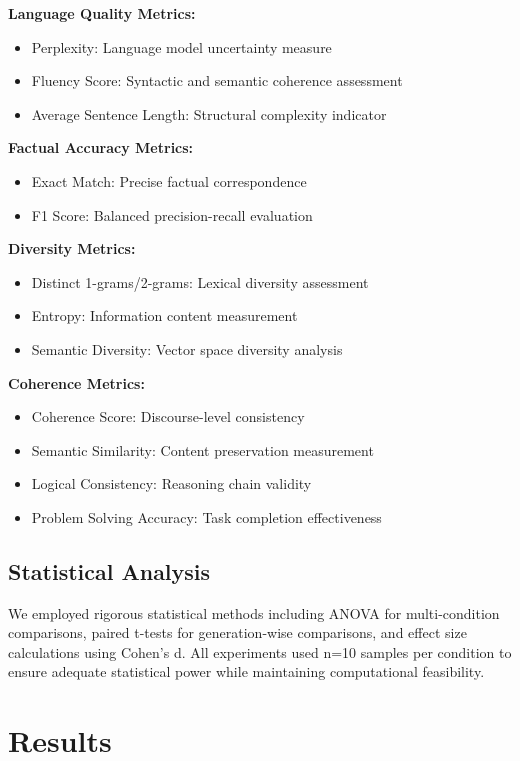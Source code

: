 \documentclass{article}
\begin{document}
\textbf{Language Quality Metrics:}
\begin{itemize}
\item Perplexity: Language model uncertainty measure
\item Fluency Score: Syntactic and semantic coherence assessment
\item Average Sentence Length: Structural complexity indicator
\end{itemize}

\textbf{Factual Accuracy Metrics:}
\begin{itemize}
\item Exact Match: Precise factual correspondence
\item F1 Score: Balanced precision-recall evaluation
\end{itemize}

\textbf{Diversity Metrics:}
\begin{itemize}
\item Distinct 1-grams/2-grams: Lexical diversity assessment
\item Entropy: Information content measurement
\item Semantic Diversity: Vector space diversity analysis
\end{itemize}

\textbf{Coherence Metrics:}
\begin{itemize}
\item Coherence Score: Discourse-level consistency
\item Semantic Similarity: Content preservation measurement
\item Logical Consistency: Reasoning chain validity
\item Problem Solving Accuracy: Task completion effectiveness
\end{itemize}

\subsection{Statistical Analysis}

We employed rigorous statistical methods including ANOVA for multi-condition comparisons, paired t-tests for generation-wise comparisons, and effect size calculations using Cohen's d. All experiments used n=10 samples per condition to ensure adequate statistical power while maintaining computational feasibility.

\section{Results}
\end{document}

